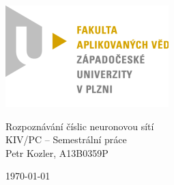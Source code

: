 \documentclass[12pt, a4paper, titlepage]{report}
\begin{document}
\begin{titlepage}
\begin{flushleft} 
{\includegraphics{img/logo.png}\\[3cm]}
\end{flushleft}
\begin{center}

{\huge Rozpoznávání číslic neuronovou sítí\\[0.3cm]}
{\large KIV/PC – Semestrální práce\\[1.7cm]}
{\large Petr Kozler, A13B0359P\\}

\vfill
{\large \today}
\end{center}
\end{titlepage}

\tableofcontents

\newpage
\end{document}

